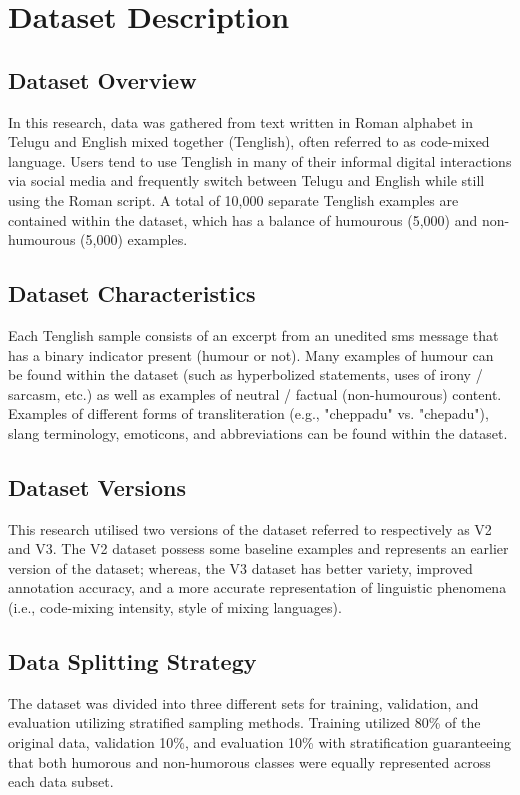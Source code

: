 \documentclass[conference]{IEEEtran}
\begin{document}
\section{Dataset Description}

\subsection{Dataset Overview}
In this research, data was gathered from text written in Roman alphabet in Telugu and English mixed together (Tenglish), often referred to as code-mixed language. Users tend to use Tenglish in many of their informal digital interactions via social media and frequently switch between Telugu and English while still using the Roman script. A total of 10,000 separate Tenglish examples are contained within the dataset, which has a balance of humourous (5,000) and non-humourous (5,000) examples.

\subsection{Dataset Characteristics}
Each Tenglish sample consists of an excerpt from an unedited sms message that has a binary indicator present (humour or not). Many examples of humour can be found within the dataset (such as hyperbolized statements, uses of irony / sarcasm, etc.) as well as examples of neutral / factual (non-humourous) content. Examples of different forms of transliteration (e.g., "cheppadu" vs. "chepadu"), slang terminology, emoticons, and abbreviations can be found within the dataset.

\subsection{Dataset Versions}
This research utilised two versions of the dataset referred to respectively as V2 and V3. The V2 dataset possess some baseline examples and represents an earlier version of the dataset; whereas, the V3 dataset has better variety, improved annotation accuracy, and a more accurate representation of linguistic phenomena (i.e., code-mixing intensity, style of mixing languages).

\subsection{Data Splitting Strategy}
The dataset was divided into three different sets for training, validation, and evaluation utilizing stratified sampling methods. Training utilized 80\% of the original data, validation 10\%, and evaluation 10\% with stratification guaranteeing that both humorous and non-humorous classes were equally represented across each data subset. 
\end{document}
